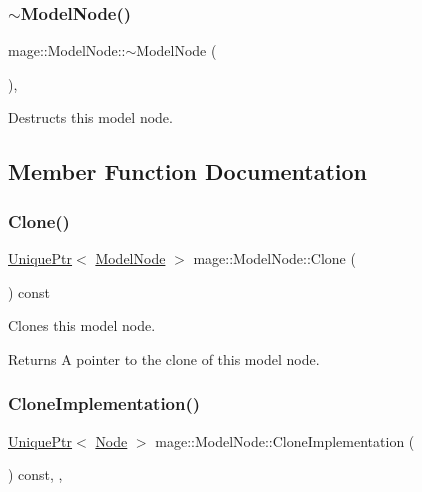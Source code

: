 \subsubsection{\texorpdfstring{$\sim$\+Model\+Node()}{~ModelNode()}}
{\footnotesize\ttfamily mage\+::\+Model\+Node\+::$\sim$\+Model\+Node (\begin{DoxyParamCaption}{ }\end{DoxyParamCaption})\hspace{0.3cm}{\ttfamily [virtual]}, {\ttfamily [default]}}

Destructs this model node. 

\subsection{Member Function Documentation}
\hypertarget{classmage_1_1_model_node_a766f90e1d626c455ba552a3ded08b948}{}\label{classmage_1_1_model_node_a766f90e1d626c455ba552a3ded08b948} 
\subsubsection{\texorpdfstring{Clone()}{Clone()}}
{\footnotesize\ttfamily \hyperlink{namespacemage_a3316d7143a973e37adf1110f2e80ca31}{Unique\+Ptr}$<$ \hyperlink{classmage_1_1_model_node}{Model\+Node} $>$ mage\+::\+Model\+Node\+::\+Clone (\begin{DoxyParamCaption}{ }\end{DoxyParamCaption}) const}

Clones this model node.

\begin{DoxyReturn}{Returns}
A pointer to the clone of this model node. 
\end{DoxyReturn}
\hypertarget{classmage_1_1_model_node_a34146201083015276b38240af307417f}{}\label{classmage_1_1_model_node_a34146201083015276b38240af307417f} 
\subsubsection{\texorpdfstring{Clone\+Implementation()}{CloneImplementation()}}
{\footnotesize\ttfamily \hyperlink{namespacemage_a3316d7143a973e37adf1110f2e80ca31}{Unique\+Ptr}$<$ \hyperlink{classmage_1_1_node}{Node} $>$ mage\+::\+Model\+Node\+::\+Clone\+Implementation (\begin{DoxyParamCaption}{ }\end{DoxyParamCaption}) const\hspace{0.3cm}{\ttfamily [override]}, {\ttfamily [private]}, {\ttfamily [virtual]}}

